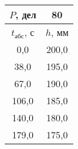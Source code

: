 \begin{tabular}[t]{|c|c|}
\hline
$P$, дел & 80 \\
\hline
$t_{абс}$, с & $h$, мм \\ 
\hline
0,0 & 200,0 \\ 
38,0 & 195,0 \\ 
67,0 & 190,0 \\ 
106,0 & 185,0 \\ 
140,0 & 180,0 \\ 
179,0 & 175,0 \\ 
\hline
\end{tabular}